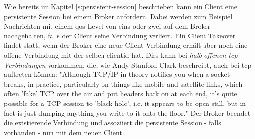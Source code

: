 \label{s:client-takeover}
Wie bereits im Kapitel \ref{s:persistent-session} beschrieben kann ein Client eine persistente Session bei einem Broker anfordern. Dabei werden zum Beispiel Nachrichten mit einem \ac{qos} Level von eins oder zwei auf dem Broker nachgehalten, falls der Client seine Verbindung verliert. Ein Client Takeover findet statt, wenn der Broker eine neue Client Verbindung erhält aber noch eine offene Verbindung mit der selben \ac{clientid} hat. Dies kann bei \textit{halb-offenen \acs{tcp} Verbindungen} vorkommen, die, wie Andy Stanford-Clark beschreibt, auch bei \ac{tcp} auftreten können:
"Although TCP/IP in theory notifies you when a socket breaks, in practice, particularly on things like mobile and satellite links, which often 'fake' TCP over the air and put headers back on at each end, it’s quite possible for a TCP session to 'black hole', i.e. it appears to be open still, but in fact is just dumping anything you write to it onto the floor."
Der Broker beendet die existierende Verbindung und assoziiert die persistente Session - falls vorhanden - nun mit dem neuen Client.
\cite{teamKeepAliveClient}

